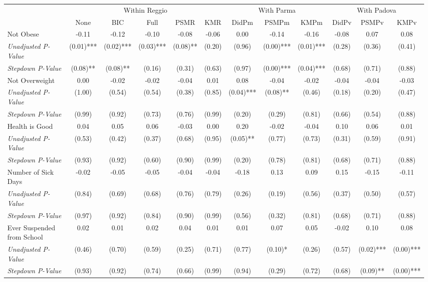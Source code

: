 \begin{tabular}{l c c c c c c c c c c c}
\toprule
& \multicolumn{5}{c}{Within Reggio} & \multicolumn{3}{c}{With Parma} & \multicolumn{3}{c}{With Padova} \\\cmidrule(lr){2-6} \cmidrule(lr){7-9} \cmidrule(lr){10-12}
 & None & BIC & Full & PSMR & KMR & DidPm & PSMPm & KMPm & DidPv & PSMPv & KMPv \\
\midrule
Not Obese & -0.11 & -0.12 & -0.10 & -0.08 & -0.06 & 0.00 & -0.14 & -0.16 & -0.08 & 0.07 & 0.08 \\
\quad \textit{Unadjusted P-Value} & (0.01)*** & (0.02)*** & (0.03)*** & (0.08)** & (0.20) & (0.96) & (0.00)*** & (0.01)*** & (0.28) & (0.36) & (0.41) \\
\quad \textit{Stepdown P-Value} & (0.08)** & (0.08)** & (0.16) & (0.31) & (0.63) & (0.97) & (0.00)*** & (0.04)*** & (0.68) & (0.71) & (0.88) \\
Not Overweight & 0.00 & -0.02 & -0.02 & -0.04 & 0.01 & 0.08 & -0.04 & -0.02 & -0.04 & -0.04 & -0.03 \\
\quad \textit{Unadjusted P-Value} & (1.00) & (0.54) & (0.54) & (0.38) & (0.85) & (0.04)*** & (0.08)** & (0.46) & (0.18) & (0.20) & (0.47) \\
\quad \textit{Stepdown P-Value} & (0.99) & (0.92) & (0.73) & (0.76) & (0.99) & (0.20) & (0.29) & (0.81) & (0.66) & (0.54) & (0.88) \\
Health is Good & 0.04 & 0.05 & 0.06 & -0.03 & 0.00 & 0.20 & -0.02 & -0.04 & 0.10 & 0.06 & 0.01 \\
\quad \textit{Unadjusted P-Value} & (0.53) & (0.42) & (0.37) & (0.68) & (0.95) & (0.05)** & (0.77) & (0.73) & (0.31) & (0.59) & (0.91) \\
\quad \textit{Stepdown P-Value} & (0.93) & (0.92) & (0.60) & (0.90) & (0.99) & (0.20) & (0.78) & (0.81) & (0.68) & (0.71) & (0.88) \\
Number of Sick Days & -0.02 & -0.05 & -0.05 & -0.04 & -0.04 & -0.18 & 0.13 & 0.09 & 0.15 & -0.15 & -0.11 \\
\quad \textit{Unadjusted P-Value} & (0.84) & (0.69) & (0.68) & (0.76) & (0.79) & (0.26) & (0.19) & (0.56) & (0.37) & (0.50) & (0.57) \\
\quad \textit{Stepdown P-Value} & (0.97) & (0.92) & (0.84) & (0.90) & (0.99) & (0.56) & (0.32) & (0.81) & (0.68) & (0.71) & (0.88) \\
Ever Suspended from School & 0.02 & 0.01 & 0.02 & 0.04 & 0.01 & 0.01 & 0.07 & 0.05 & -0.02 & 0.10 & 0.08 \\
\quad \textit{Unadjusted P-Value} & (0.46) & (0.70) & (0.59) & (0.25) & (0.71) & (0.77) & (0.10)* & (0.26) & (0.57) & (0.02)*** & (0.00)*** \\
\quad \textit{Stepdown P-Value} & (0.93) & (0.92) & (0.74) & (0.66) & (0.99) & (0.94) & (0.29) & (0.72) & (0.68) & (0.09)** & (0.00)*** \\
\bottomrule
\end{tabular}
